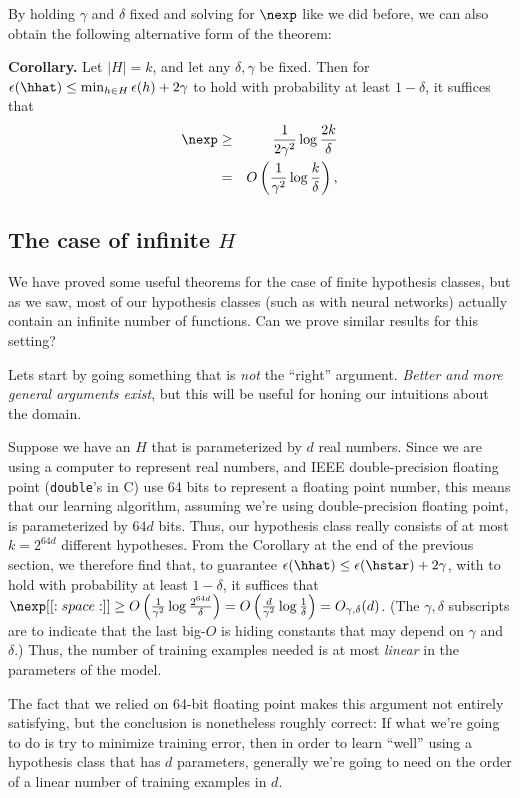 By holding $\gamma$ and $\delta$ fixed and solving for $\nexp$ like we
did before, we can also obtain the following alternative form of the
theorem:

\noindent
{\bf Corollary.} Let $|H|=k$, and let any $\delta, \gamma$ be fixed.  Then for
$\epsilon(\hhat) \leq \min_{h \in H} \epsilon(h) + 2 \gamma$ to hold with probability at least $1-\delta$,
it suffices that 
\begin{eqnarray*}
\nexp &\geq& \frac{1}{2\gamma^2}\log\frac{2k}{\delta}\\
  &=& O\left(\frac{1}{\gamma^2}\log\frac{k}{\delta}\right),
\end{eqnarray*}


\subsection{The case of infinite $H$}

We have proved some useful theorems for the case of finite hypothesis 
classes, but as we saw, most of our
hypothesis classes (such as with neural networks) actually contain an infinite number of functions.
Can we prove similar results for this setting?  

Lets start by going something that is \emph{not} the ``right'' argument.
\emph{Better and more general arguments exist}, but this will be useful for 
honing our intuitions about the domain.  

Suppose we have an $H$ that is parameterized by $d$ real numbers.  Since we are using a computer to
represent real numbers, and IEEE double-precision floating point ({\tt double}'s in C) use 64 bits
to represent a floating point number, this means that our learning algorithm, assuming we're using
double-precision floating point,  is parameterized by $64d$ bits.  Thus, our hypothesis class
really consists of at most $k=2^{64d}$ different hypotheses.  From the Corollary at the end of the
previous section, we therefore find that, to guarantee 
$\epsilon(\hhat) \leq \epsilon(\hstar) + 2 \gamma$, with to hold with probability at least $1-\delta$,
it suffices that 
$\nexp[[:space:]]\geq O\left(\frac{1}{\gamma^2}\log\frac{2^{64d}}{\delta}\right)
= O\left(\frac{d}{\gamma^2}\log\frac{1}{\delta}\right)
= O_{\gamma,\delta}(d)$.  (The $\gamma,\delta$ subscripts are to indicate that the last big-$O$ is hiding constants that may 
depend on $\gamma$ and $\delta$.)  Thus, the number of training examples needed is at most \emph{linear}
in the parameters of the model. 

The fact that we relied on 64-bit floating point makes this argument not entirely satisfying, 
but the conclusion is nonetheless roughly correct: If what we're going to do is try to minimize training error,
then in order to learn ``well'' using a hypothesis class that has $d$ parameters, generally we're
going to need on the order of a linear number of training examples in $d$. 

